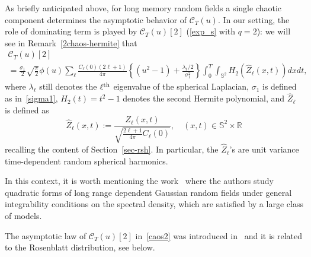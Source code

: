 \documentclass[AHL,Unicode,longabstracts,published]{cedram}
\newcommand{\clC}{\mathcal{C}}
\newcommand{\bbS}{\mathbb{S}}
\newcommand{\bbR}{\mathbb{R}}
\begin{document}
As briefly anticipated above, for long memory random fields a single chaotic component determines the asymptotic behavior of $\clC_T(u)$. In our setting, the role of dominating term is played by $\clC_T(u)[2]$ (\eqref{exp_s} with $q=2$): we will see in Remark~\ref{2chaos-hermite} that
\begin{multline}\label{caos2}
\clC_T(u)[2]\\
=\frac{\sigma _{1}}{2}\sqrt{\frac{\pi }{2}}\phi (u)\sum_{\ell } \frac{C_{\ell }(0)(2\ell +1)}{4\pi } \left\{ (u^{2}-1)+\frac{
\lambda _{\ell }/2}{\sigma _{1}^{2}}\right\} \int_0^T\int_{\bbS ^{2}}H_{2}\left(\widehat Z_{\ell }(x,t)\right)dxdt,
\end{multline}
where $\lambda_\ell$ still denotes the $\ell^{\rm th}$ eigenvalue of the spherical Laplacian, $\sigma_1$ is defined as in~\eqref{sigma1}, $ H_2(t)=t^2-1$ denotes the second Hermite polynomial, and $\widehat{Z}_\ell$ is defined as
\begin{equation}\label{zhat}
\widehat Z_\ell (x,t) := \frac{Z_\ell(x,t)}{\sqrt{\frac{2\ell+1}{4\pi} C_\ell(0)}}, \quad (x,t)\in \bbS^2\times \bbR
\end{equation}
recalling the content of Section~\ref{sec-rsh}. In particular, the $\widehat Z_\ell$'s are unit variance time-dependent random spherical harmonics.

In this context, it is worth mentioning the work~\cite{LP11} where the authors study quadratic forms of long range dependent Gaussian random fields under general integrability conditions on the spectral density, which are satisfied by a large class of models.

The asymptotic law of $\clC_T(u)[2]$ in~\eqref{caos2} was introduced in~\cite{MRV:20} and it is related to the Rosenblatt distribution, see below.
\end{document}
